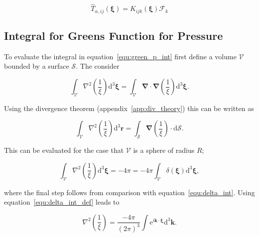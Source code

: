 \documentclass[12pt]{article}
\begin{document}
\begin{equation}
\label{equ:stress_green}
\hat{T}_{\alpha, ij}(\boldsymbol\xi) = K_{ijk} (\boldsymbol\xi) \mathcal{F}_{k}
\end{equation}

\subsection{Integral for Greens Function for Pressure}
\label{sub_app:green_p}

To evaluate the integral in equation~\ref{equ:green_p_int} first define a volume $\mathcal{V}$ bounded by a surface $\mathcal{S}$. The consider

\begin{equation}
\label{equ:int_del_recip}
\int_{\mathcal{V}} \nabla^{2} \left(\frac{1}{\xi}\right) \mathrm{d} ^{3} \boldsymbol{\xi} = \int_{\mathcal{V}} \boldsymbol{\nabla} \cdot \boldsymbol{\nabla} \left(\frac{1}{\xi}\right) \mathrm{d} ^{3} \boldsymbol{\xi} .
\end{equation}

Using the divergence theorem (appendix~\ref{app:div_theory}) this can be written as

\begin{equation}
\label{equ:sint_del_recip}
\int_{\mathcal{V}} \nabla^{2} \left(\frac{1}{\xi}\right) \mathrm{d} ^{3} \boldsymbol{r} = \int_{\mathcal{S}} \boldsymbol{\nabla} \left(\frac{1}{\xi}\right) \cdot \mathrm{d} \mathcal{S} .
\end{equation}

This can be evaluated for the case that $\mathcal{V}$ is a sphere of radius $R$;

\begin{equation}
\label{equ:int_del_recip_eval}
\int_{\mathcal{V}} \nabla^{2} \left(\frac{1}{\xi}\right) \mathrm{d} ^{3} \boldsymbol{\xi} = - 4 \pi = -4 \pi \int_{\mathcal{V}} \delta(\boldsymbol{\xi}) \mathrm{d}^{3} \boldsymbol{\xi} ,
\end{equation}

where the final step follows from comparison with equation~\ref{equ:delta_int}. Using equation~\ref{equ:delta_int_def} leads to

\begin{equation}
\label{equ:del_square_recip}
\nabla^{2} \left(\frac{1}{\xi}\right) = \frac{-4 \pi}{(2 \pi)^{3}} \int \mathrm{e}^{i \boldsymbol{k} \cdot \boldsymbol{\xi}} \mathrm{d}^{3} \boldsymbol{k} .
\end{equation}
\end{document}
